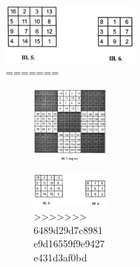 \begin{figure}[H]
\begin{figure}[H]
\begin{figure}[h]
\begin{figure}[h]
\includegraphics{src/figures/chap3/fig3-34.jpg}
=======
\begin{figure}[H]
\includegraphics[scale=.8]{src/figures/chap3/fig3.33.jpg}
\end{figure}

\begin{figure}[H]
\includegraphics[scale=.8]{src/figures/chap3/fig3.34.jpg}
>>>>>>> 6489d29d7c8981e9d16559f9e9427e431d3af0bd
\end{figure}


\end{figure}
\end{figure}
\end{figure}
\end{figure}
